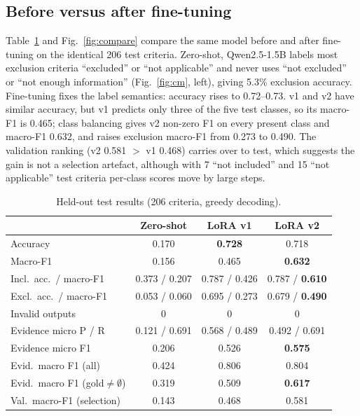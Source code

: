 \documentclass[conference]{IEEEtran}
\begin{document}
\subsection{Before versus after fine-tuning}
Table~\ref{tab:main} and Fig.~\ref{fig:compare} compare the same model before and after fine-tuning on the identical 206 test criteria. Zero-shot, Qwen2.5-1.5B labels most exclusion criteria ``excluded'' or ``not applicable'' and never uses ``not excluded'' or ``not enough information'' (Fig.~\ref{fig:cm}, left), giving 5.3\% exclusion accuracy. Fine-tuning fixes the label semantics: accuracy rises to 0.72--0.73. v1 and v2 have similar accuracy, but v1 predicts only three of the five test classes, so its macro-F1 is 0.465; class balancing gives v2 non-zero F1 on every present class and macro-F1 0.632, and raises exclusion macro-F1 from 0.273 to 0.490. The validation ranking (v2 0.581 $>$ v1 0.468) carries over to test, which suggests the gain is not a selection artefact, although with 7 ``not included'' and 15 ``not applicable'' test criteria per-class scores move by large steps.

\begin{table}[t]
\centering
\caption{Held-out test results (206 criteria, greedy decoding).}
\label{tab:main}
\footnotesize
\setlength{\tabcolsep}{3pt}
\begin{tabular}{lccc}
\toprule
 & Zero-shot & LoRA v1 & \textbf{LoRA v2} \\
\midrule
Accuracy & 0.170 & \textbf{0.728} & 0.718 \\
Macro-F1 & 0.156 & 0.465 & \textbf{0.632} \\
Incl.\ acc.\ / macro-F1 & 0.373 / 0.207 & 0.787 / 0.426 & 0.787 / \textbf{0.610} \\
Excl.\ acc.\ / macro-F1 & 0.053 / 0.060 & 0.695 / 0.273 & 0.679 / \textbf{0.490} \\
Invalid outputs & 0 & 0 & 0 \\
\midrule
Evidence micro P / R & 0.121 / 0.691 & 0.568 / 0.489 & 0.492 / 0.691 \\
Evidence micro F1 & 0.206 & 0.526 & \textbf{0.575} \\
Evid.\ macro F1 (all) & 0.424 & 0.806 & 0.804 \\
Evid.\ macro F1 (gold$\neq\emptyset$) & 0.319 & 0.509 & \textbf{0.617} \\
\midrule
Val.\ macro-F1 (selection) & 0.143 & 0.468 & 0.581 \\
\bottomrule
\end{tabular}
\end{table}
\end{document}
